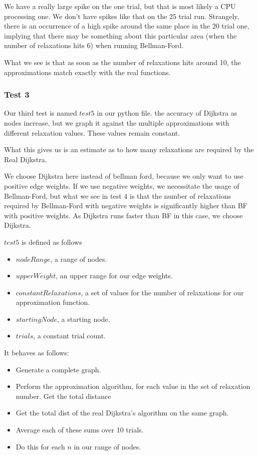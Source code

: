 \documentclass{article}
\begin{document}
We have a really large spike on the one trial, but that is most likely a CPU processing one. We don't have spikes like that on the 25 trial run. Strangely, there is an occurrence of a high spike around the same place in the 20 trial one, implying that there may be something about this particular area (when the number of relaxations hits 6) when running Bellman-Ford.

What we see is that as soon as the number of relaxations hits around 10, the approximations match exactly with the real functions.


\newpage
\subsubsection{Test 3}

Our third test is named $test5$ in our python file. the accuracy of Dijkstra as nodes increase, but we graph it against the multiple approximations with different relaxation values. These values remain constant.

What this gives us is an estimate as to how many relaxations are required by the Real Dijkstra.

We choose Dijkstra here instead of bellman ford, because we only want to use positive edge weights. If we use negative weights, we necessitate the usage of Bellman-Ford, but what we see in test 4 is that the number of relaxations required by Bellman-Ford with negative weights is significantly higher than BF with positive weights. As Dijkstra runs faster than BF in this case, we choose Dijkstra.

$test5$ is defined as follows
\begin{itemize}
 \item $nodeRange$, a range of nodes.
 \item $upperWeight$, an upper range for our edge weights.
 \item $constantRelaxations$, a set of values for the number of relaxations for our approximation function.
 \item $startingNode$,  a starting node.
 \item $trials$, a constant trial count.
\end{itemize}

It behaves as follows:
\begin{itemize}
    \item Generate a complete graph.
    \item Perform the approximation algorithm, for each value in the set of relaxation number. Get the total distance
    \item Get the total dist of the real Dijkstra's algorithm on the same graph.
    \item Average each of these sums over 10 trials.
    \item Do this for each $n$ in our range of nodes.
\end{itemize}
\end{document}
